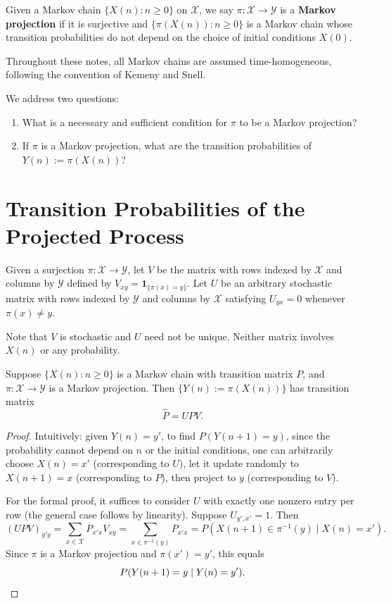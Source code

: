 \documentclass[12pt]{ximera}
\begin{document}
\begin{definition}
Given a Markov chain $\{X(n) : n \geq 0\}$ on $\mathcal{X}$, we say $\pi : \mathcal{X} \to \mathcal{Y}$ is a \textbf{Markov projection} if it is surjective and $\{\pi(X(n)) : n \geq 0\}$ is a Markov chain whose transition probabilities do not depend on the choice of initial conditions $X(0)$.
\end{definition}

\begin{remark}
Throughout these notes, all Markov chains are assumed time-homogeneous, following the convention of Kemeny and Snell.
\end{remark}

We address two questions:
\begin{enumerate}[label=\arabic*.]
\item What is a necessary and sufficient condition for $\pi$ to be a Markov projection?
\item If $\pi$ is a Markov projection, what are the transition probabilities of $Y(n) := \pi(X(n))$?
\end{enumerate}

\section*{Transition Probabilities of the Projected Process}

\begin{definition}[Notation]
Given a surjection $\pi : \mathcal{X} \to \mathcal{Y}$, let $V$ be the matrix with rows indexed by $\mathcal{X}$ and columns by $\mathcal{Y}$ defined by $V_{xy} = \mathbf{1}_{\{\pi(x) = y\}}$. Let $U$ be an arbitrary stochastic matrix with rows indexed by $\mathcal{Y}$ and columns by $\mathcal{X}$ satisfying $U_{yx} = 0$ whenever $\pi(x) \neq y$.
\end{definition}

Note that $V$ is stochastic and $U$ need not be unique. Neither matrix involves $X(n)$ or any probability.

\begin{theorem}
Suppose $\{X(n) : n \geq 0\}$ is a Markov chain with transition matrix $P$, and $\pi : \mathcal{X} \to \mathcal{Y}$ is a Markov projection. Then $\{Y(n) := \pi(X(n))\}$ has transition matrix
\[
\hat{P} = UPV.
\]
\end{theorem}

\begin{proof}
Intuitively: given $Y(n) = y'$, to find $P(Y(n+1) = y)$, since the probability cannot depend on $n$ or the initial conditions, one can arbitrarily choose $X(n) = x'$ (corresponding to $U$), let it update randomly to $X(n+1) = x$ (corresponding to $P$), then project to $y$ (corresponding to $V$).

For the formal proof, it suffices to consider $U$ with exactly one nonzero entry per row (the general case follows by linearity). Suppose $U_{y',x'} = 1$. Then
\[
(UPV)_{y'y} = \sum_{x \in \mathcal{X}} P_{x'x} V_{xy} = \sum_{x \in \pi^{-1}(y)} P_{x'x} = P(X(n+1) \in \pi^{-1}(y) \mid X(n) = x').
\]
Since $\pi$ is a Markov projection and $\pi(x') = y'$, this equals
\[
P(Y(n+1) = y \mid Y(n) = y'). 
\qedhere
\]
\end{proof}
\end{document}
